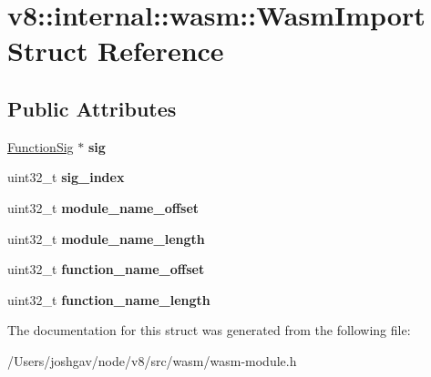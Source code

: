 \hypertarget{structv8_1_1internal_1_1wasm_1_1_wasm_import}{}\section{v8\+:\+:internal\+:\+:wasm\+:\+:Wasm\+Import Struct Reference}
\label{structv8_1_1internal_1_1wasm_1_1_wasm_import}
\subsection*{Public Attributes}
\begin{DoxyCompactItemize}
\item 
\hyperlink{classv8_1_1internal_1_1_signature}{Function\+Sig} $\ast$ {\bfseries sig}\hypertarget{structv8_1_1internal_1_1wasm_1_1_wasm_import_ad9505014560b4ec3699c1552ef81e777}{}\label{structv8_1_1internal_1_1wasm_1_1_wasm_import_ad9505014560b4ec3699c1552ef81e777}

\item 
uint32\+\_\+t {\bfseries sig\+\_\+index}\hypertarget{structv8_1_1internal_1_1wasm_1_1_wasm_import_a4685427e4205b8bfd6a94c511fc454b6}{}\label{structv8_1_1internal_1_1wasm_1_1_wasm_import_a4685427e4205b8bfd6a94c511fc454b6}

\item 
uint32\+\_\+t {\bfseries module\+\_\+name\+\_\+offset}\hypertarget{structv8_1_1internal_1_1wasm_1_1_wasm_import_a6ecdabd889e5a10e36efdb3583924869}{}\label{structv8_1_1internal_1_1wasm_1_1_wasm_import_a6ecdabd889e5a10e36efdb3583924869}

\item 
uint32\+\_\+t {\bfseries module\+\_\+name\+\_\+length}\hypertarget{structv8_1_1internal_1_1wasm_1_1_wasm_import_aedc77967286ae52b0253a49b8cc04948}{}\label{structv8_1_1internal_1_1wasm_1_1_wasm_import_aedc77967286ae52b0253a49b8cc04948}

\item 
uint32\+\_\+t {\bfseries function\+\_\+name\+\_\+offset}\hypertarget{structv8_1_1internal_1_1wasm_1_1_wasm_import_a04267718c3f5d455bc16315059b09b7f}{}\label{structv8_1_1internal_1_1wasm_1_1_wasm_import_a04267718c3f5d455bc16315059b09b7f}

\item 
uint32\+\_\+t {\bfseries function\+\_\+name\+\_\+length}\hypertarget{structv8_1_1internal_1_1wasm_1_1_wasm_import_a3548f7a85b4efd65665bfd516b9eac65}{}\label{structv8_1_1internal_1_1wasm_1_1_wasm_import_a3548f7a85b4efd65665bfd516b9eac65}

\end{DoxyCompactItemize}


The documentation for this struct was generated from the following file\+:\begin{DoxyCompactItemize}
\item 
/\+Users/joshgav/node/v8/src/wasm/wasm-\/module.\+h\end{DoxyCompactItemize}
